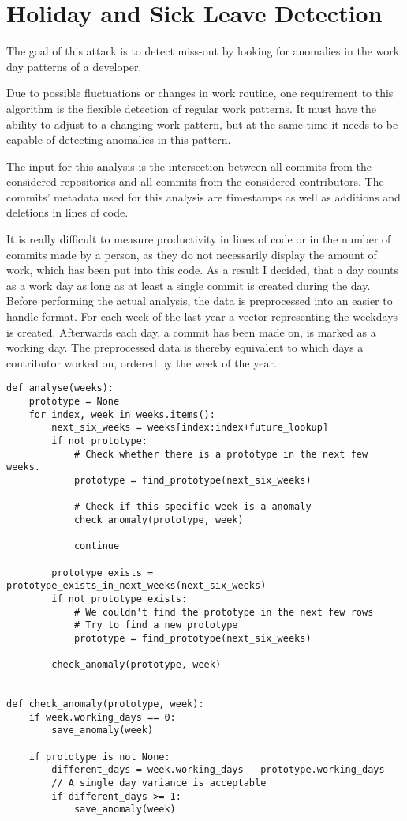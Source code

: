 \section{Holiday and Sick Leave Detection}

The goal of this attack is to detect miss-out by looking for anomalies in the work day patterns of a developer.

Due to possible fluctuations or changes in work routine, one requirement to this algorithm is the flexible detection of regular work patterns.
It must have the ability to adjust to a changing work pattern, but at the same time it needs to be capable of detecting anomalies in this pattern.

The input for this analysis is the intersection between all commits from the considered repositories and all commits from the considered contributors.
The commits' metadata used for this analysis are timestamps as well as additions and deletions in lines of code.

It is really difficult to measure productivity in lines of code or in the number of commits made by a person, as they do not necessarily display the amount of work, which has been put into this code.
As a result I decided, that a day counts as a work day as long as at least a single commit is created during the day.
Before performing the actual analysis, the data is preprocessed into an easier to handle format.
For each week of the last year a vector representing the weekdays is created.
Afterwards each day, a commit has been made on, is marked as a working day.
The preprocessed data is thereby equivalent to which days a contributor worked on, ordered by the week of the year.

\begin{verbatim}
def analyse(weeks):
    prototype = None
    for index, week in weeks.items():
        next_six_weeks = weeks[index:index+future_lookup]
        if not prototype:
            # Check whether there is a prototype in the next few weeks.
            prototype = find_prototype(next_six_weeks)

            # Check if this specific week is a anomaly
            check_anomaly(prototype, week)

            continue

        prototype_exists = prototype_exists_in_next_weeks(next_six_weeks)
        if not prototype_exists:
            # We couldn't find the prototype in the next few rows
            # Try to find a new prototype
            prototype = find_prototype(next_six_weeks)

        check_anomaly(prototype, week)


def check_anomaly(prototype, week):
    if week.working_days == 0:
        save_anomaly(week)

    if prototype is not None:
        different_days = week.working_days - prototype.working_days
        // A single day variance is acceptable
        if different_days >= 1:
            save_anomaly(week)

\end{verbatim}
\begingroup
{}\label{lst:miss-out-algorithm}
\endgroup

